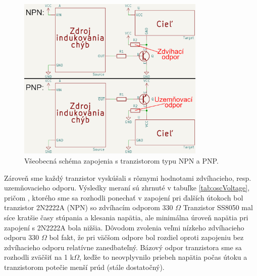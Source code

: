 \begin{figure}
    \centerline{\includegraphics[width=0.8\textwidth]{images/npnVpnp.png}}
    \caption[Všeobecná schéma zapojenia s tranzistorom typu NPN a PNP]{Všeobecná schéma zapojenia s tranzistorom typu NPN a PNP.}
    \label{obr:npnVpnp}
\end{figure}

Zároveň sme každý tranzistor vyskúšali s rôznymi hodnotami zdvíhacieho, resp. uzemňovacieho odporu. Výsledky meraní sú zhrnuté v tabuľke \ref{tab:oscVoltage}, pričom , ktorého sme sa rozhodli ponechať v zapojení pri ďalších útokoch bol tranzistor 2N2222A (NPN) so zdvíhacím odporom 330 $\Omega$ Tranzistor SS8050 mal síce kratšie časy stúpania a klesania napätia, ale minimálna úroveň napätia pri zapojení s 2N2222A bola nižšia. Dôvodom zvolenia veľmi nízkeho zdvíhacieho odporu 330 $\Omega$ bol fakt, že pri väčšom odpore bol rozdiel oproti zapojeniu bez zdvíhacieho odporu relatívne zanedbateľný. Bázový odpor tranzistora sme sa rozhodli zväčšiť na 1 k$\Omega$, keďže to neovplyvnilo priebeh napätia počas útoku a tranzistorom potečie menší prúd (stále dostatočný).

